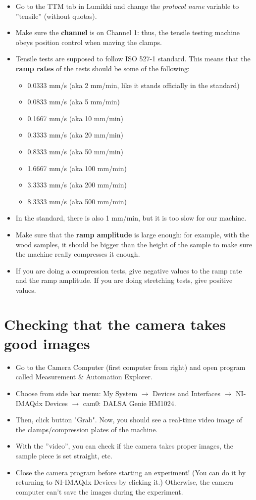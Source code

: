 \documentclass[a4paper]{article}
\begin{document}
\begin{itemize}
  \item Go to the TTM tab in Lumikki and change the \textit{protocol name} variable to ''tensile'' (without quotas).
  \item Make sure the \textbf{channel} is on Channel 1: thus, the tensile testing machine obeys position control when maving the clamps.
  \item Tensile tests are supposed to follow ISO 527-1 standard. This means that the \textbf{ramp rates} of the tests should be some of the following:
  \begin{itemize}
    \item 0.0333 mm/s (aka 2 mm/min, like it stands officially in the standard)
    \item 0.0833 mm/s (aka 5 mm/min)
    \item 0.1667 mm/s (aka 10 mm/min)
    \item 0.3333 mm/s (aka 20 mm/min)
    \item 0.8333 mm/s (aka 50 mm/min)
    \item 1.6667 mm/s (aka 100 mm/min)
    \item 3.3333 mm/s (aka 200 mm/min)
    \item 8.3333 mm/s (aka 500 mm/min)
  \end{itemize}
  \item In the standard, there is also 1 mm/min, but it is too slow for our machine.
  \item Make sure that the \textbf{ramp amplitude} is large enough: for example, with the wood samples, it should be bigger than the height of the sample to make sure the machine really compresses it enough.
  \item If you are doing a compression tests, give negative values to the ramp rate and the ramp amplitude. If you are doing stretching tests, give positive values.
\end{itemize}

\section{Checking that the camera takes good images}

\begin{itemize}
  \item Go to the Camera Computer (first computer from right) and open program called Measurement \& Automation Explorer.
  \item Choose from side bar menu: My System $\rightarrow$ Devices and Interfaces $\rightarrow$ NI-IMAQdx Devices $\rightarrow$ cam0: DALSA Genie HM1024.
  \item Then, click button "Grab". Now, you should see a real-time video image of the clamps/compression plates of the machine.
  \item With the ''video'', you can check if the camera takes proper images, the sample piece is set straight, etc.
  \item Close the camera program before starting an experiment! (You can do it by returning to NI-IMAQdx Devices by clicking it.) Otherwise, the camera computer can't save the images during the experiment.
\end{itemize}
\end{document}
